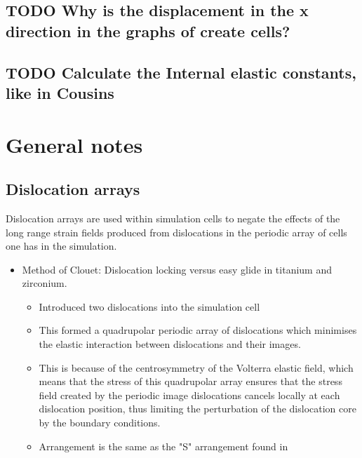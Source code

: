 \documentclass[11pt]{article}
\begin{document}
\subsection{{\bfseries\sffamily TODO} Why is the displacement in the x direction in the graphs of create cells?}
\label{sec:orga16752c}
\subsection{{\bfseries\sffamily TODO} Calculate the Internal elastic constants, like in Cousins \cite{Cousins1979}}
\label{sec:orgaf3da9a}
\section{General notes}
\label{sec:orgc1b2c2e}
\subsection{Dislocation arrays}
\label{sec:org8c99471}
Dislocation arrays are used within simulation cells to negate the effects of
the long range strain fields produced from dislocations in the periodic array
of cells one has in the simulation.
\begin{itemize}
\item Method of Clouet: Dislocation locking versus easy glide in titanium and
zirconium. \cite{Clouet2015} 
\begin{itemize}
\item Introduced two dislocations into the simulation cell
\item This formed a quadrupolar periodic array of dislocations which
minimises the elastic interaction between dislocations and their
images.
\item This is because of the centrosymmetry of the Volterra elastic field,
which means that the stress of this quadrupolar array ensures that the
stress field created by the periodic image dislocations cancels locally
at each dislocation position, thus limiting the perturbation of the
dislocation core by the boundary conditions.
\item Arrangement is the same as the "S" arrangement found in
\cite{Clouet2012}
\end{itemize}
\end{itemize}
\end{document}
